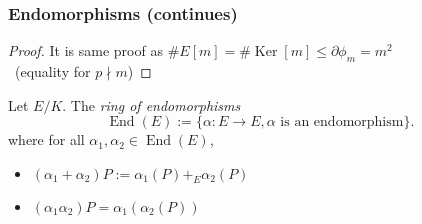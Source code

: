 \documentclass[10pt,handout]{beamer} %
\begin{document}
\begin{frame}
\frametitle{Endomorphisms (continues)}

\pause

\begin{proof}
It is same proof as $\#E[m]=\#\operatorname{Ker}[m]\le\partial\phi_m= m^2$\pause \\ \ \hfill (equality for $p\nmid m$)
\end{proof}\pause

\begin{Definition} Let $E/K$. The \emph{ring of endomorphisms}
\alert{$$\operatorname{End}(E):=\{\alpha: E\rightarrow E, \alpha\text{ is an endomorphism}\}.$$}
where for all $\alpha_1,\alpha_2\in\operatorname{End}(E)$,\pause
\begin{itemize}[<+-|alert@+>]
  \item $(\alpha_1+\alpha_2)P:=\alpha_1(P)+_E\alpha_2(P)$
  \item $(\alpha_1\alpha_2)P=\alpha_1(\alpha_2(P))$
\end{itemize}
\end{Definition}
\end{frame}
\end{document}
